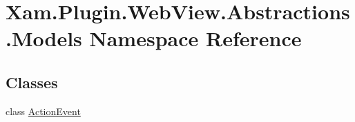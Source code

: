 \hypertarget{namespace_xam_1_1_plugin_1_1_web_view_1_1_abstractions_1_1_models}{}\section{Xam.\+Plugin.\+Web\+View.\+Abstractions.\+Models Namespace Reference}
\label{namespace_xam_1_1_plugin_1_1_web_view_1_1_abstractions_1_1_models}
\subsection*{Classes}
\begin{DoxyCompactItemize}
\item 
class \hyperlink{class_xam_1_1_plugin_1_1_web_view_1_1_abstractions_1_1_models_1_1_action_event}{Action\+Event}
\end{DoxyCompactItemize}

